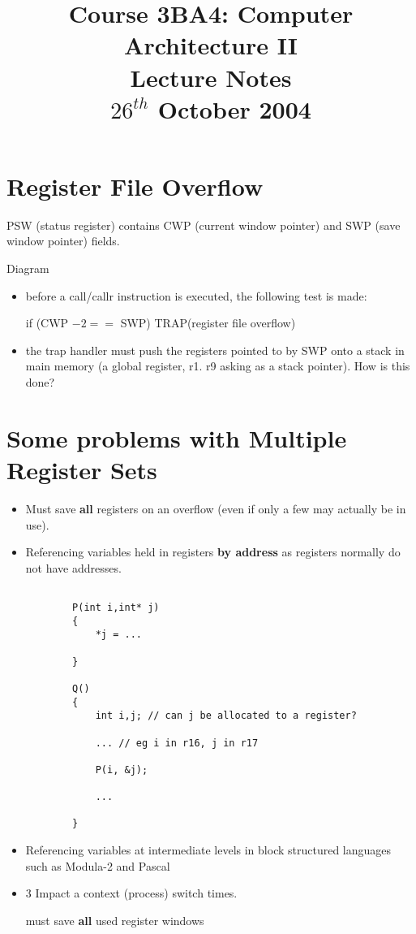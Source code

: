 \documentclass[a4paper,12pt]{article}
\begin{document}
\title{Course 3BA4: Computer Architecture II \\ Lecture Notes \\ $26^{th}$ October 2004}

\maketitle

\section*{Register File Overflow}

PSW (status register) contains CWP (current window pointer) and SWP
(save window pointer) fields.


Diagram

\begin{itemize}

\item before a call/callr instruction is executed, the following 
test is made:

\subitem if (CWP $- 2 ==$ SWP)
\subsubitem TRAP(register file overflow)

\item the trap handler must push the registers pointed to by SWP 
 onto a stack in main memory (a global register, r1. r9 asking as a 
 stack pointer). How is this done?
  
\end{itemize}

\section*{Some problems with Multiple Register Sets}


\begin{itemize}

\item Must save \textbf{all} registers on an overflow (even if only a 
few may actually be in use).

\item Referencing variables held in registers \textbf{by address} as
registers normally do not have addresses.

\begin{verbatim}

		P(int i,int* j)
		{
			*j = ...

		}

		Q()
		{
			int i,j; // can j be allocated to a register?

			... // eg i in r16, j in r17

			P(i, &j);

			...

		}
\end{verbatim}

\item Referencing variables at intermediate levels in block structured
languages such as Modula-2 and Pascal

\item 3 Impact a context (process) switch times.

\subitem must save \textbf{all} used register windows

\end{itemize}
\end{document}
